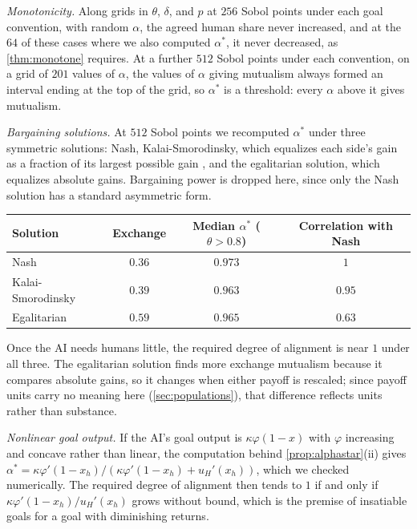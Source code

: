 \documentclass[article, 11pt, reqno]{amsart}
\theoremstyle{named}
\theoremstyle{plain}
\begin{document}
\textit{Monotonicity.} Along grids in $\theta$, $\delta$, and $p$ at $256$ Sobol points under each goal convention, with random $\alpha$, the agreed human share never increased, and at the $64$ of these cases where we also computed $\alpha^*$, it never decreased, as \cref{thm:monotone} requires. At a further $512$ Sobol points under each convention, on a grid of $201$ values of $\alpha$, the values of $\alpha$ giving mutualism always formed an interval ending at the top of the grid, so $\alpha^*$ is a threshold: every $\alpha$ above it gives mutualism.

\textit{Bargaining solutions.} At $512$ Sobol points we recomputed $\alpha^*$ under three symmetric solutions: Nash, Kalai-Smorodinsky, which equalizes each side's gain as a fraction of its largest possible gain \citep{KalaiSmorodinsky1975}, and the egalitarian solution, which equalizes absolute gains. Bargaining power is dropped here, since only the Nash solution has a standard asymmetric form.
\begin{center}
\begin{tabular}{lccc}
\toprule
Solution & Exchange & Median $\alpha^*$ ($\theta > 0.8$) & Correlation with Nash \\
\midrule
Nash & $0.36$ & $0.973$ & $1$ \\
Kalai-Smorodinsky & $0.39$ & $0.963$ & $0.95$ \\
Egalitarian & $0.59$ & $0.965$ & $0.63$ \\
\bottomrule
\end{tabular}
\end{center}
Once the AI needs humans little, the required degree of alignment is near $1$ under all three. The egalitarian solution finds more exchange mutualism because it compares absolute gains, so it changes when either payoff is rescaled; since payoff units carry no meaning here (\cref{sec:populations}), that difference reflects units rather than substance.

\textit{Nonlinear goal output.} If the AI's goal output is $\kappa\varphi(1-x)$ with $\varphi$ increasing and concave rather than linear, the computation behind \cref{prop:alphastar}(ii) gives $\alpha^* = \kappa\varphi'(1-x_h)/(\kappa\varphi'(1-x_h) + u_H'(x_h))$, which we checked numerically. The required degree of alignment then tends to $1$ if and only if $\kappa\varphi'(1-x_h)/u_H'(x_h)$ grows without bound, which is the premise of insatiable goals for a goal with diminishing returns.
\end{document}
